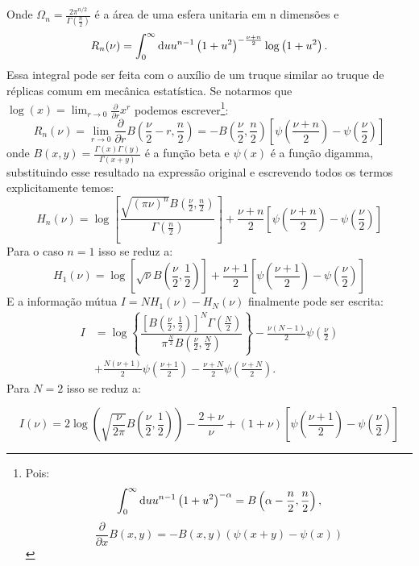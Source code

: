 Onde $\Omega_n = \frac{2\pi^{n/2}}{\Gamma\left(\frac{n}{2}\right)}$ é a área de uma esfera unitaria em n dimensões e \[R_n(\nu) = \int_{0}^\infty \mathrm{d} u u^{n-1} \left(1+u^2\right)^{-\frac{\nu+n}{2}}\log\left(1 + u^2\right). \] Essa integral pode ser feita com o auxílio de um truque similar ao truque de réplicas comum em mecânica estatística. Se notarmos que $\log(x) = \lim_{r\to 0}\frac{\partial}{\partial r}x^r$ podemos escrever\footnote{Pois: \[\int_{0}^\infty \mathrm{d} u u^{n-1} \left(1+u^2\right)^{-\alpha} = B\left(\alpha - \frac{n}{2}, \frac{n}{2}\right),\]\[\frac{\partial}{\partial x} B(x,y) = - B(x,y) (\psi(x+y) - \psi(x))\]}:
\[
R_n(\nu) = \lim_{r\to 0} \frac{\partial}{\partial r}B\left(\frac{\nu}{2}-r, \frac{n}{2}\right) = - B\left(\frac{\nu}{2}, \frac{n}{2}\right)\left[\psi\left(\frac{\nu+n}{2}\right) -\psi\left(\frac{\nu}{2}\right)\right]
\]
onde $B(x,y) = \frac{\Gamma(x)\Gamma(y)}{\Gamma(x+y)}$ é a função beta e $\psi(x)$ é a função digamma, substituindo esse resultado na expressão original e escrevendo todos os termos explicitamente temos:
\begin{equation}
H_n(\nu) = \log\left[\frac{\sqrt{(\pi\nu)^{n}}B\left(\frac{\nu}{2}, \frac{n}{2}\right)}{\Gamma\left(\frac{n}{2}\right)}\right] + \frac{\nu + n}{2} \left[\psi\left(\frac{\nu+n}{2}\right) -\psi\left(\frac{\nu}{2}\right)\right]
\end{equation}
Para o caso $n=1$ isso se reduz a:
\begin{equation}
H_1(\nu) = \log\left[\sqrt{\nu}B\left(\frac{\nu}{2}, \frac{1}{2}\right)\right] + \frac{\nu + 1}{2} \left[\psi\left(\frac{\nu+1}{2}\right) -\psi\left(\frac{\nu}{2}\right)\right]
\end{equation}
E a informação mútua $I = N H_1(\nu) - H_N(\nu)$ finalmente pode ser escrita:
\begin{align*}
 I  & = \log\left\lbrace\dfrac{\left[B\left(\frac{\nu}{2},\frac{1}{2}\right)\right]^N\Gamma\left(\frac{N}{2}\right)}{\pi^{\frac{N}{2}}B\left(\frac{\nu}{2},\frac{N}{2}\right)}\right\rbrace  - \frac{\nu(N-1)}{2}\psi\left(\frac{\nu}{2}\right) \\ & +\frac{N(\nu+1)}{2}\psi\left(\frac{\nu + 1 }{2}\right) - \frac{\nu+N}{2}\psi\left(\frac{\nu + N}{2}\right).
\end{align*}
Para $N = 2$ isso se reduz a:
\begin{fullwidth}
\centering
\begin{equation}
  \label{eq:excesst}
  I(\nu) = 2\log\left(\sqrt{\frac{\nu}{2\pi}}B\left(\frac{\nu}{2},\frac{1}{2}\right) \right) - \frac{2+\nu}{\nu} + (1+\nu)\left[ \psi \left(\frac{\nu+1}{2}\right) - \psi \left(\frac{\nu}{2}\right) \right]
\end{equation}
\end{fullwidth}
\newpage

